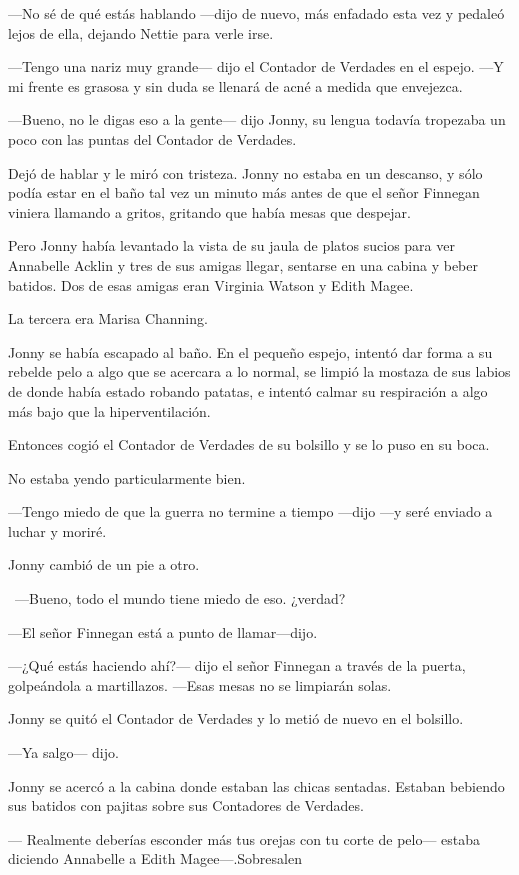 ---No sé de qué estás hablando ---dijo de nuevo, más enfadado esta vez y
pedaleó lejos de ella, dejando Nettie para verle irse.

---Tengo una nariz muy grande--- dijo el Contador de Verdades en el
espejo. ---Y mi frente es grasosa y sin duda se llenará de acné a medida
que envejezca.

---Bueno, no le digas eso a la gente--- dijo Jonny, su lengua todavía
tropezaba un poco con las puntas del Contador de Verdades.

Dejó de hablar y le miró con tristeza. Jonny no estaba en un descanso, y
sólo podía estar en el baño tal vez un minuto más antes de que el señor
Finnegan viniera llamando a gritos, gritando que había mesas que
despejar.

Pero Jonny había levantado la vista de su jaula de platos sucios para
ver Annabelle Acklin y tres de sus amigas llegar, sentarse en una cabina
y beber batidos. Dos de esas amigas eran Virginia Watson y Edith Magee.

La tercera era Marisa Channing.

Jonny se había escapado al baño. En el pequeño espejo, intentó dar forma
a su rebelde pelo a algo que se acercara a lo normal, se limpió la
mostaza de sus labios de donde había estado robando patatas, e intentó
calmar su respiración a algo más bajo que la hiperventilación.

Entonces cogió el Contador de Verdades de su bolsillo y se lo puso en su
boca.

No estaba yendo particularmente bien.

---Tengo miedo de que la guerra no termine a tiempo ---dijo ---y seré
enviado a luchar y moriré.

Jonny cambió de un pie a otro.

~---Bueno, todo el mundo tiene miedo de eso. ¿verdad?

---El señor Finnegan está a punto de llamar---dijo.

---¿Qué estás haciendo ahí?--- dijo el señor Finnegan a través de la
puerta, golpeándola a martillazos. ---Esas mesas no se limpiarán solas.

Jonny se quitó el Contador de Verdades y lo metió de nuevo en el
bolsillo.

---Ya salgo--- dijo.

Jonny se acercó a la cabina donde estaban las chicas sentadas. Estaban
bebiendo sus batidos con pajitas sobre sus Contadores de Verdades.

--- Realmente deberías esconder más tus orejas con tu corte de pelo---
estaba diciendo Annabelle a Edith Magee---.Sobresalen

